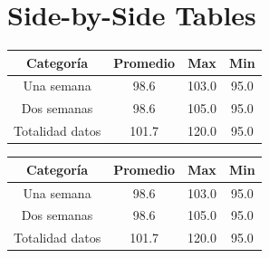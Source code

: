 \documentclass{article}%
\begin{document}
%
\normalsize%
\section{Side{-}by{-}Side Tables}%
\label{sec:Side{-}by{-}SideTables}%


\begin{table}[h!]%
\begin{minipage}{0.3\textwidth}%
\centering%
\begin{tabular}{|c |c |c |c |}%
\hline%
Categoría&Promedio&Max&Min\\%
\hline%
Una semana&98.6&103.0&95.0\\%
\hline%
Dos semanas&98.6&105.0&95.0\\%
\hline%
Totalidad datos&101.7&120.0&95.0\\%
\hline%
\end{tabular}%
\end{minipage}%
\hfill%
\begin{minipage}{0.48\textwidth}%
\centering%
\begin{tabular}{|c |c |c |c |}%
\hline%
Categoría&Promedio&Max&Min\\%
\hline%
Una semana&98.6&103.0&95.0\\%
\hline%
Dos semanas&98.6&105.0&95.0\\%
\hline%
Totalidad datos&101.7&120.0&95.0\\%
\hline%
\end{tabular}%
\end{minipage}%
\end{table}

%
\end{document}
